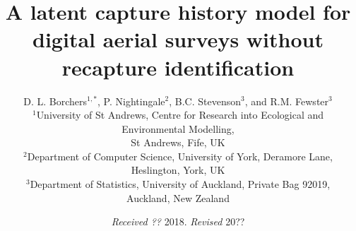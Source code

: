\documentclass[useAMS, usenatbib, referee]{biom}\usepackage[]{graphicx}\usepackage[]{color}
\begin{document}
\title{A latent capture history model for digital aerial surveys without recapture identification}

\author{D. L. Borchers\(^{1, *}\),
P. Nightingale\(^{2}\),
B.C. Stevenson\(^{3}\), and
R.M. Fewster\(^{3}\) \\
\(^1\)University of St Andrews, Centre for Research into Ecological and Environmental Modelling, \\St Andrews, Fife, UK \\
\(^2\)Department of Computer Science, University of York, Deramore Lane, Heslington, York, UK \\
\(^3\)Department of Statistics, University of Auckland, Private Bag 92019, \\ Auckland, New Zealand
}




\date{{\it Received ??} 2018. {\it Revised } 20??}

\pagerange{\pageref{firstpage}--\pageref{lastpage}} 



\label{firstpage}

\end{document}

